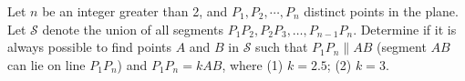 Let $n$ be an integer greater than 2, and $P_1, P_2, \cdots , P_n$ distinct points in the plane. Let $\mathcal S$ denote the union of all segments $P_1P_2, P_2P_3, \dots , P_{n-1}P_{n}$. Determine if it is always possible to find points $A$ and $B$ in $\mathcal S$ such that $P_1P_n \parallel AB$ (segment $AB$ can lie on line $P_1P_n$) and $P_1P_n = kAB$, where (1) $k = 2.5$; (2) $k = 3$.